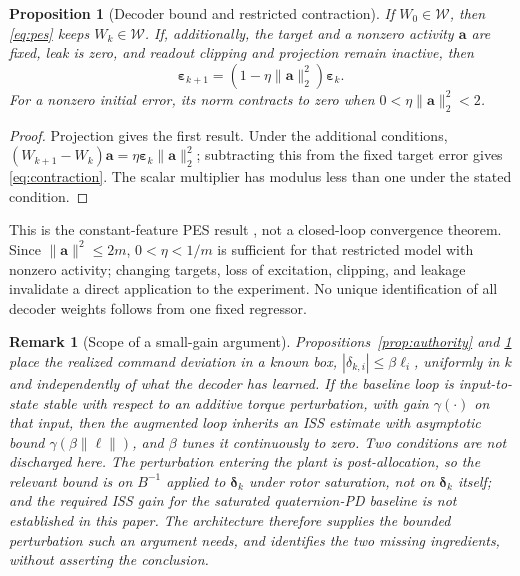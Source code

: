 \documentclass[letterpaper,10pt,conference]{IEEEtran}
\newtheorem{proposition}{Proposition}
\newtheorem{remark}{Remark}
\begin{document}
\begin{proposition}[Decoder bound and restricted contraction]
\label{prop:pes}
If $W_0\in\mathcal W$, then \eqref{eq:pes} keeps $W_k\in\mathcal W$.
If, additionally, the target and a nonzero activity $\bm a$ are fixed,
leak is zero, and readout clipping and projection remain inactive, then
\begin{equation}
 \bm\varepsilon_{k+1}
       =(1-\eta\|\bm a\|_2^2)\bm\varepsilon_k.
 \label{eq:contraction}
\end{equation}
For a nonzero initial error, its norm contracts to zero when
$0<\eta\|\bm a\|_2^2<2$.
\end{proposition}
\begin{proof}
Projection gives the first result. Under the additional conditions,
$(W_{k+1}-W_k)\bm a=\eta\bm\varepsilon_k\|\bm a\|_2^2$;
subtracting this from the fixed target error gives
\eqref{eq:contraction}. The scalar multiplier has modulus less than one
under the stated condition.
\end{proof}
This is the constant-feature PES result \cite{voelker2015pes}, not a
closed-loop convergence theorem. Since $\|\bm a\|^2\le2m$,
$0<\eta<1/m$ is sufficient for that restricted model with nonzero
activity; changing targets, loss of excitation, clipping, and leakage
invalidate a direct application to the experiment. No unique identification
of all decoder weights follows from one fixed regressor.

\begin{remark}[Scope of a small-gain argument]
\label{rem:smallgain}
Propositions~\ref{prop:authority} and \ref{prop:pes} place the realized
command deviation in a known box, $|\delta_{k,i}|\le\beta\ell_i$, uniformly
in $k$ and independently of what the decoder has learned. If the baseline
loop is input-to-state stable with respect to an additive torque
perturbation, with gain $\gamma(\cdot)$ on that input, then the augmented
loop inherits an ISS estimate with asymptotic bound
$\gamma(\beta\|\bm\ell\|)$, and $\beta$ tunes it continuously to zero. Two
conditions are not discharged here. The perturbation entering the plant is
post-allocation, so the relevant bound is on $B^{-1}$ applied to
$\bm\delta_k$ under rotor saturation, not on $\bm\delta_k$ itself; and the
required ISS gain for the saturated quaternion-PD baseline is not
established in this paper. The architecture therefore supplies the bounded
perturbation such an argument needs, and identifies the two missing
ingredients, without asserting the conclusion.
\end{remark}
\end{document}
